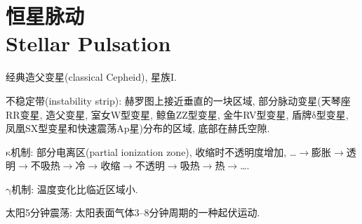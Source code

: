 \chapter{恒星脉动\\Stellar Pulsation}

经典造父变星(classical Cepheid), 星族I.

不稳定带(instability strip): 赫罗图上接近垂直的一块区域, 部分脉动变星(天琴座RR变星, 造父变星, 室女W型变星, 鲸鱼ZZ型变星, 金牛RV型变星, 盾牌$\mathrm{\delta}$型变星, 凤凰SX型变星和快速震荡Ap星)分布的区域, 底部在赫氏空隙.

$\mathrm{\kappa}$机制: 部分电离区(partial ionization zone), 收缩时不透明度增加, \dots$\to$膨胀$\to$透明$\to$不吸热$\to$冷$\to$收缩$\to$不透明$\to$吸热$\to$热$\to$\dots.

$\mathrm{\gamma}$机制: 温度变化比临近区域小.

太阳5分钟震荡: 太阳表面气体3--8分钟周期的一种起伏运动.

